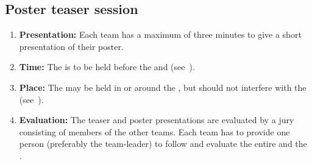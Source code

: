 \subsection{Poster teaser session}
\begin{enumerate}
	\item \textbf{Presentation:} Each team has a maximum of three minutes to give a short presentation of their poster.
	\item \textbf{Time:} The  is to be held before the \WelcomeReception{} and \PS{} (see~).
	\item \textbf{Place:} The \PS{} may be held in or around the \Arena{}, but should not interfere with the \RobotInspection{} (see~).
	\item \textbf{Evaluation:} The teaser and poster presentations are evaluated by a jury consisting of members of the other teams. Each team has to provide one person (preferably the team-leader) to follow and evaluate
	the entire  and the \PS.


\end{enumerate}
